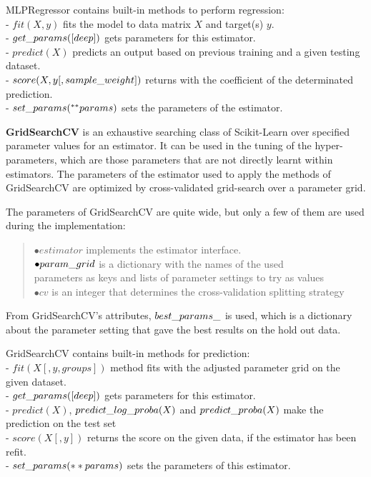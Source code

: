 MLPRegressor contains built-in methods to perform regression:\\
- $fit(X, y)$ fits the model to data matrix $X$ and target(s) $y$.\\
- $get\char`_params([deep])$ gets parameters for this estimator.\\
- $predict(X)$ predicts an output based on previous training and a given testing dataset.\\
- $score(X, y[, sample\char`_weight])$ returns with the coefficient of the determinated prediction.\\
- $set\char`_params(^{**} params)$ sets the parameters of the estimator.\bigskip


\textbf{GridSearchCV} is an exhaustive searching class of Scikit-Learn over specified parameter values for an estimator. It can be used in the tuning of the hyper-parameters, which are those parameters that are not directly learnt within estimators. The parameters of the estimator used to apply the methods of GridSearchCV are optimized by cross-validated grid-search over a parameter grid.\medskip

\noindent The parameters of GridSearchCV are quite wide, but only a few of them are used during the implementation:
\begin{verse}
	$\bullet estimator$ implements the estimator interface. \\
	$\bullet param\char`_grid$ is a dictionary with the names of the used\\ parameters as keys and lists of parameter settings to try as values\\
	$\bullet cv$ is an integer that determines the cross-validation splitting strategy
\end{verse}

From GridSearchCV's attributes, $best\char`_params\char`_$ is used, which is a dictionary about the parameter setting that gave the best results on the hold out data.\medskip

\noindent GridSearchCV contains built-in methods for prediction:\\
- $fit(X[, y, groups])$ method fits with the adjusted parameter grid on the given dataset.\\
- $get\char`_params([deep])$ gets parameters for this estimator.\\
- $predict(X)$, $predict\char`_log\char`_proba(X)$ and $predict\char`_proba(X)$ make the prediction on the test set\\
- $score(X[, y])$ returns the score on the given data, if the estimator has been refit.\\
- $set\char`_params(**params)$ sets the parameters of this estimator.\bigskip


